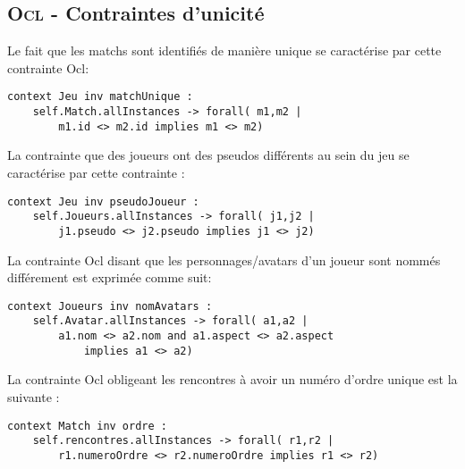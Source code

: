 
\subsection{\textsc{Ocl} - Contraintes d'unicité}
\label{sec:question3}

Le fait que les matchs sont identifiés de manière unique se caractérise par cette contrainte Ocl:

\begin{lstlisting}[caption=Contrainte sur l'unicité d'un match,captionpos=b,label={lst:match},language=OCL]
context Jeu inv matchUnique :
    self.Match.allInstances -> forall( m1,m2 |
        m1.id <> m2.id implies m1 <> m2)
\end{lstlisting}

La contrainte que des joueurs ont des pseudos différents au sein du jeu se caractérise par cette contrainte :

\begin{lstlisting}[caption=Contrainte sur les pseudos,captionpos=b,label={lst:pseudos},language=OCL]
context Jeu inv pseudoJoueur :
    self.Joueurs.allInstances -> forall( j1,j2 |
        j1.pseudo <> j2.pseudo implies j1 <> j2)
\end{lstlisting}

La contrainte Ocl disant que les personnages/avatars d'un joueur sont nommés différement est exprimée comme suit:

\begin{lstlisting}[caption=Contrainte sur le nom,captionpos=b,label={lst:nomAvatar},language=OCL]
context Joueurs inv nomAvatars :
    self.Avatar.allInstances -> forall( a1,a2 |
        a1.nom <> a2.nom and a1.aspect <> a2.aspect
            implies a1 <> a2)
\end{lstlisting}

La contrainte Ocl obligeant les rencontres à avoir un numéro d'ordre unique est la suivante :

\begin{lstlisting}[caption=Contrainte sur le numéro d'ordre unique,captionpos=b,label={lst:numUnique},language=OCL]
context Match inv ordre :
    self.rencontres.allInstances -> forall( r1,r2 |
        r1.numeroOrdre <> r2.numeroOrdre implies r1 <> r2)
\end{lstlisting}